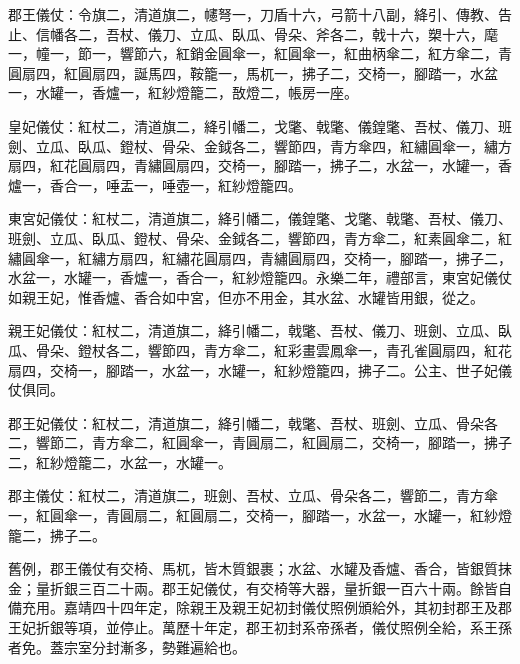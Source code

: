 \begin{pinyinscope}
郡王儀仗：令旗二，清道旗二，幰弩一，刀盾十六，弓箭十八副，絳引、傳教、告止、信幡各二，吾杖、儀刀、立瓜、臥瓜、骨朵、斧各二，戟十六，槊十六，麾一，幢一，節一，響節六，紅銷金圓傘一，紅圓傘一，紅曲柄傘二，紅方傘二，青圓扇四，紅圓扇四，誕馬四，鞍籠一，馬杌一，拂子二，交椅一，腳踏一，水盆一，水罐一，香爐一，紅紗燈籠二，敔燈二，帳房一座。

皇妃儀仗：紅杖二，清道旗二，絳引幡二，戈氅、戟氅、儀鍠氅、吾杖、儀刀、班劍、立瓜、臥瓜、鐙杖、骨朵、金鉞各二，響節四，青方傘四，紅繡圓傘一，繡方扇四，紅花圓扇四，青繡圓扇四，交椅一，腳踏一，拂子二，水盆一，水罐一，香爐一，香合一，唾盂一，唾壺一，紅紗燈籠四。

東宮妃儀仗：紅杖二，清道旗二，絳引幡二，儀鍠氅、戈氅、戟氅、吾杖、儀刀、班劍、立瓜、臥瓜、鐙杖、骨朵、金鉞各二，響節四，青方傘二，紅素圓傘二，紅繡圓傘一，紅繡方扇四，紅繡花圓扇四，青繡圓扇四，交椅一，腳踏一，拂子二，水盆一，水罐一，香爐一，香合一，紅紗燈籠四。永樂二年，禮部言，東宮妃儀仗如親王妃，惟香爐、香合如中宮，但亦不用金，其水盆、水罐皆用銀，從之。

親王妃儀仗：紅杖二，清道旗二，絳引幡二，戟氅、吾杖、儀刀、班劍、立瓜、臥瓜、骨朵、鐙杖各二，響節四，青方傘二，紅彩畫雲鳳傘一，青孔雀圓扇四，紅花扇四，交椅一，腳踏一，水盆一，水罐一，紅紗燈籠四，拂子二。公主、世子妃儀仗俱同。

郡王妃儀仗：紅杖二，清道旗二，絳引幡二，戟氅、吾杖、班劍、立瓜、骨朵各二，響節二，青方傘二，紅圓傘一，青圓扇二，紅圓扇二，交椅一，腳踏一，拂子二，紅紗燈籠二，水盆一，水罐一。

郡主儀仗：紅杖二，清道旗二，班劍、吾杖、立瓜、骨朵各二，響節二，青方傘一，紅圓傘一，青圓扇二，紅圓扇二，交椅一，腳踏一，水盆一，水罐一，紅紗燈籠二，拂子二。

舊例，郡王儀仗有交椅、馬杌，皆木質銀裹；水盆、水罐及香爐、香合，皆銀質抹金；量折銀三百二十兩。郡王妃儀仗，有交椅等大器，量折銀一百六十兩。餘皆自備充用。嘉靖四十四年定，除親王及親王妃初封儀仗照例頒給外，其初封郡王及郡王妃折銀等項，並停止。萬歷十年定，郡王初封系帝孫者，儀仗照例全給，系王孫者免。蓋宗室分封漸多，勢難遍給也。


\end{pinyinscope}